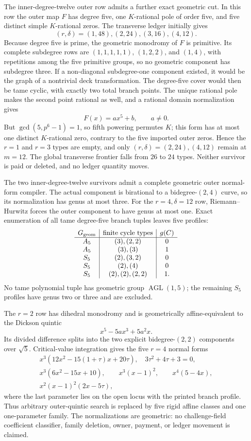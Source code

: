 \documentclass[11pt]{article}
\begin{document}
The inner-degree-twelve outer row admits a further exact geometric cut.  In
this row the outer map \(F\) has degree five, one \(K\)-rational pole of
order five, and five distinct simple \(K\)-rational zeros.  The transverse
ledger initially gives
\[
  (r,\delta)=(1,48),(2,24),(3,16),(4,12).
\]
Because degree five is prime, the geometric monodromy of \(F\) is
primitive.  Its complete subdegree rows are
\((1,1,1,1,1)\), \((1,2,2)\), and \((1,4)\), with repetitions among the five
primitive groups, so no geometric component has subdegree three.  If a
non-diagonal subdegree-one component existed, it would be the graph of a
nontrivial deck transformation.  The degree-five cover would then be tame
cyclic, with exactly two total branch points.  The unique rational pole
makes the second point rational as well, and a rational domain normalization
gives
\[
  F(x)=a x^5+b,\qquad a\ne0.
\]
But \(\gcd(5,p^6-1)=1\), so fifth powering permutes \(K\); this form has at
most one distinct \(K\)-rational zero, contrary to the five imported outer
zeros.  Hence the \(r=1\) and \(r=3\) types are empty, and only
\((r,\delta)=(2,24),(4,12)\) remain at \(m=12\).  The global transverse
frontier falls from \(26\) to \(24\) types.  Neither survivor is paid or
deleted, and no ledger quantity moves.

The two inner-degree-twelve survivors admit a complete geometric outer
normal-form compiler.  The actual component is birational to a
bidegree-\((2,4)\) curve, so its normalization has genus at most three.
For the \(r=4,\delta=12\) row, Riemann--Hurwitz forces the outer component
to have genus at most one.  Exact enumeration of all tame degree-five branch
tuples leaves five profiles:
\[
\begin{array}{c|c|c}
G_{\rm geom}&\text{finite cycle types}&g(C)\\ \hline
A_5&(3),(2,2)&0\\
A_5&(3),(3)&1\\
S_5&(2),(3,2)&0\\
S_5&(2),(4)&0\\
S_5&(2),(2),(2,2)&1.
\end{array}
\]
No tame polynomial tuple has geometric group
\(\operatorname{AGL}(1,5)\); the remaining \(S_5\) profiles have genus two
or three and are excluded.

The \(r=2\) row has dihedral monodromy and is geometrically affine-equivalent
to the Dickson quintic
\[
  x^5-5ax^3+5a^2x.
\]
Its divided difference splits into the two explicit bidegree-\((2,2)\)
components over \(\sqrt5\).  Critical-value integration gives the five
\(r=4\) normal forms
\[
\begin{gathered}
x^3(12x^2-15(1+\tau)x+20\tau),\quad
  3\tau^2+4\tau+3=0,\\
x^3(6x^2-15x+10),\qquad x^3(x-1)^2,\qquad
x^4(5-4x),\\
x^2(x-1)^2(2x-5\tau),
\end{gathered}
\]
where the last parameter lies on the open locus with the printed branch
profile.  Thus arbitrary outer-quintic search is replaced by five rigid
affine classes and one one-parameter family.  The normalizations are
geometric: no challenge-field coefficient classifier, family deletion,
owner, payment, or ledger movement is claimed.
\end{document}
